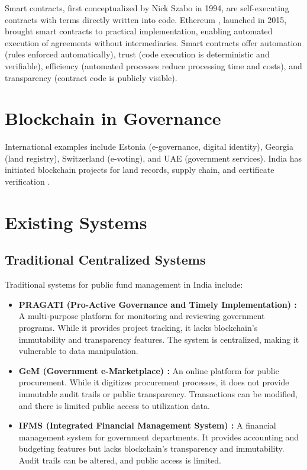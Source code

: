 \documentclass[12pt,a4wide]{report}
\theoremstyle{plain}
\theoremstyle{definition}
\theoremstyle{remark}
\begin{document}
Smart contracts, first conceptualized by Nick Szabo \cite{szabo1994} in 1994, are self-executing contracts with terms directly written into code. Ethereum \cite{buterin2014}, launched in 2015, brought smart contracts to practical implementation, enabling automated execution of agreements without intermediaries. Smart contracts offer automation (rules enforced automatically), trust (code execution is deterministic and verifiable), efficiency (automated processes reduce processing time and costs), and transparency (contract code is publicly visible).

\section{Blockchain in Governance}

International examples include Estonia \cite{estonia2017} (e-governance, digital identity), Georgia \cite{georgia2016} (land registry), Switzerland \cite{switzerland2019} (e-voting), and UAE \cite{uae2020} (government services). India has initiated blockchain projects for land records, supply chain, and certificate verification \cite{india2021}.

\section{Existing Systems}

\subsection{Traditional Centralized Systems}

Traditional systems for public fund management in India include:

\begin{itemize}
    \item \textbf{PRAGATI (Pro-Active Governance and Timely Implementation) \cite{pragati2015}:} A multi-purpose platform for monitoring and reviewing government programs. While it provides project tracking, it lacks blockchain's immutability and transparency features. The system is centralized, making it vulnerable to data manipulation.
    
    \item \textbf{GeM (Government e-Marketplace) \cite{gem2016}:} An online platform for public procurement. While it digitizes procurement processes, it does not provide immutable audit trails or public transparency. Transactions can be modified, and there is limited public access to utilization data.
    
    \item \textbf{IFMS (Integrated Financial Management System) \cite{ifms2018}:} A financial management system for government departments. It provides accounting and budgeting features but lacks blockchain's transparency and immutability. Audit trails can be altered, and public access is limited.
\end{itemize}
\end{document}
